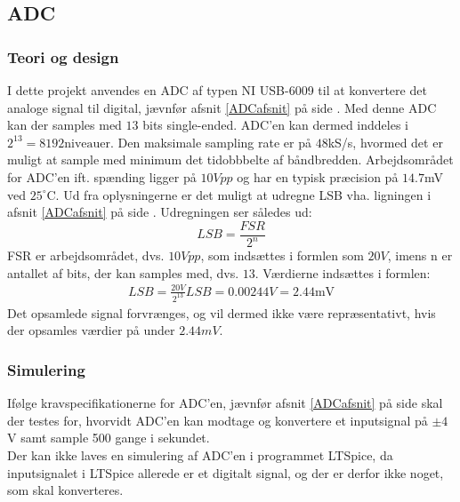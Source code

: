 \subsection{ADC}\label{ADC_afsnit}
\subsubsection{Teori og design}
I dette projekt anvendes en ADC af typen NI USB-6009 til at konvertere det analoge signal til digital, jævnfør afsnit \ref{ADCafsnit} på side \pageref{ADCafsnit}. %
Med denne ADC kan der samples med $13$ bits single-ended. ADC'en kan dermed inddeles i $2^{13} = 8192 \text{niveauer}$. Den maksimale sampling rate er på $48$kS/s, hvormed det er muligt at sample med minimum det tidobbbelte af båndbredden. Arbejdsområdet for ADC'en ift. spænding ligger på $10Vpp$ og har en typisk præcision på $14.7$mV ved $25^{\circ}$C. \cite{Instruments2014} Ud fra oplysningerne er det muligt at udregne LSB vha. ligningen i afsnit \ref{ADCafsnit} på side \pageref{ADCafsnit}. Udregningen ser således ud: \\
\begin{equation}
	LSB = \frac{FSR}{2^{n}} 
\end{equation}  
FSR er arbejdsområdet, dvs. $10Vpp$, som indsættes i formlen som $20V$, imens n er antallet af bits, der kan samples med, dvs. $13$.
Værdierne indsættes i formlen: \\
\begin{align}
	LSB = \frac{20V}{2^{13}}
	LSB = 0.00244V = 2.44\text{mV}
\end{align}
Det opsamlede signal forvrænges, og vil dermed ikke være repræsentativt, hvis der opsamles værdier på under $2.44mV$.\\
\subsubsection{Simulering}
Ifølge kravspecifikationerne for ADC'en, jævnfør afsnit \ref{ADCafsnit} på side \pageref{ADCafsnit} skal der testes for, hvorvidt ADC'en kan modtage og konvertere et inputsignal på $\pm4$V samt sample 500 gange i sekundet. \\
Der kan ikke laves en simulering af ADC'en i programmet LTSpice, da inputsignalet i LTSpice allerede er et digitalt signal, og der er derfor ikke noget, som skal konverteres.
 
